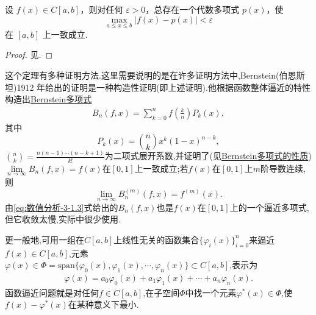 \documentclass[../../main.tex]{subfiles}
\begin{document}
\begin{theorem}
设 \( f(x) \in C[a,b] \)，则对任何 \( \varepsilon > 0 \)，总存在一个代数多项式 \( p(x) \)，使
\[
\max_{a \leqslant x \leqslant b} | f(x) - p(x) | < \varepsilon
\]
在 \([a,b]\) 上一致成立.
\end{theorem}
\begin{proof}
见.

\end{proof}
\begin{remark}
这个定理有多种证明方法.这里需要说明的是在许多证明方法中,Bernstein(伯恩斯坦)1912 年给出的证明是一种构造性证明(即上述证明).他根据函数整体逼近的特性构造出\hyperref[definition:一维Bernstein多项式]{Bernstein多项式}
\begin{align}
B_n(f,x)=\sum_{k=0}^n f\left(\frac{k}{n}\right)P_k(x), \label{eq:数值分析-3-1.3}
\end{align}
其中
\[
P_k(x)=\binom{n}{k}x^k(1-x)^{n-k},
\]
$\binom{n}{k}=\frac{n(n-1)\cdots(n-k+1)}{k!}$为二项式展开系数,并证明了(见\hyperref[theorem:Bernstein多项式的性质]{Bernstein多项式的性质})$\lim\limits_{n\to\infty} B_n(f,x)=f(x)$在$[0,1]$上一致成立;若$f(x)$在$[0,1]$上$m$阶导数连续,则
\[
\lim\limits_{n\to\infty} B_n^{(m)}(f,x)=f^{(m)}(x).
\]
由\eqref{eq:数值分析-3-1.3}式给出的$B_n(f,x)$也是$f(x)$在$[0,1]$上的一个逼近多项式,但它收敛太慢,实际中很少使用.

更一般地,可用一组在$C[a,b]$上线性无关的函数集合$\{\varphi_i(x)\}_{i=0}^n$来逼近$f(x)\in C[a,b]$,元素$\varphi(x)\in \Phi=\text{span}\{\varphi_0(x),\varphi_1(x),\cdots,\varphi_n(x)\}\subset C[a,b]$,表示为
\begin{align}
\varphi(x)=a_0\varphi_0(x)+a_1\varphi_1(x)+\cdots+a_n\varphi_n(x). \label{eq:数值分析-3-1.4}
\end{align}
函数逼近问题就是对任何$f\in C[a,b]$,在子空间$\Phi$中找一个元素$\varphi^*(x)\in \Phi$,使$f(x)-\varphi^*(x)$在某种意义下最小.
\end{remark}
\end{document}
